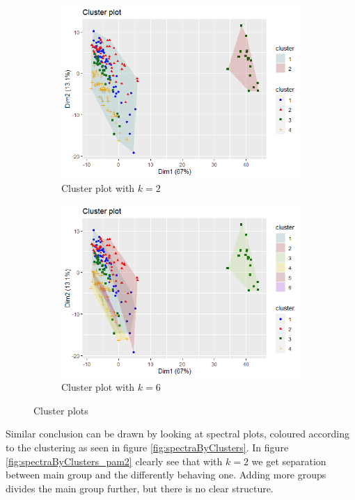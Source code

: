 \documentclass[12pt]{article}
\begin{document}
\begin{figure}[h]
  \begin{subfigure}[b]{0.5\linewidth}
      \centering
      \includegraphics[width=\textwidth]{../images/project2/clusPlot_pam2.png}
   \caption{Cluster plot with $k=2$}\label{fig:clusPlot_pam2}
  \end{subfigure}%
  \begin{subfigure}[b]{0.5\linewidth}
      \centering
   \includegraphics[width=\textwidth]{../images/project2/clusPlot_pam6.png}
   \caption{Cluster plot with $k=6$}\label{fig:clusPlot_pam6}
  \end{subfigure}%
 \caption{Cluster plots}
\end{figure}

Similar conclusion can be drawn by looking at spectral plots, coloured according to the clustering as seen in figure \ref{fig:spectraByClusters}. In figure \ref{fig:spectraByClusters_pam2}
clearly see that with $k=2$ we get separation between main group and the differently behaving one. Adding more groups divides the main group further, but there is no clear
structure.
\end{document}

